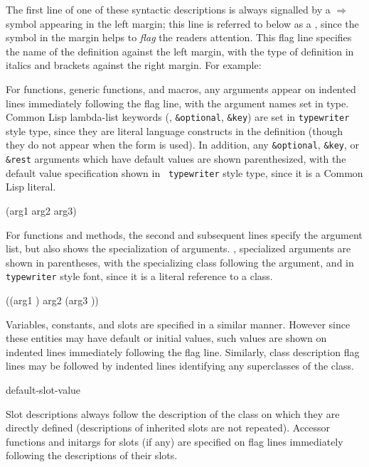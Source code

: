The first line of one of these syntactic descriptions is always signalled by a
$\Rightarrow$ symbol appearing in the left margin; this line is referred to
below as a , since the symbol in the margin helps to
{\em flag} the readers attention. This flag line specifies the name of the
definition against the left margin, with the type of definition in italics and
brackets against the right margin. For example:


For functions, generic functions, and macros, any arguments appear on indented
lines immediately following the flag line, with the argument names set in
 type. Common Lisp lambda-list keywords (\eg, 
\verb_&optional_, \verb_&key_) are set in {\tt typewriter} style type,
since they are literal language constructs in the definition (though they
do not appear when the form is used). In addition, any \verb_&optional_,
\verb_&key_, or \verb_&rest_ arguments which have default values are shown
parenthesized, with the default value specification shown in {\tt
typewriter} style type, since it is a Common Lisp literal.

 {(arg1 arg2 \optional arg3)}

For functions and methods, the second and subsequent lines specify the argument list, but also
shows the specialization of arguments. \Ie, specialized arguments are shown in
parentheses, with the specializing class following the argument, and in {\tt
typewriter} style font, since it is a literal reference to a class.

 {((arg1 ) arg2
                               \optional (arg3 ))}

Variables, constants, and slots are specified in a similar manner. However since
these entities may have default or initial values, such values are shown on
indented lines immediately following the flag line. Similarly, class description
flag lines may be followed by indented lines identifying any superclasses of the
class.

 {default-slot-value}

Slot descriptions always follow the description of the class on which they are
directly defined (descriptions of inherited slots are not repeated).
Accessor functions and initargs for slots (if any) are specified on flag
lines immediately following the descriptions of their slots.

